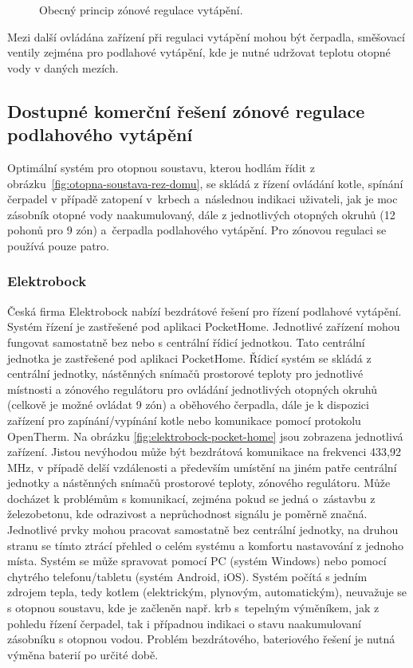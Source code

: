 \newpage
\begin{figure}[H]
    \centering
    \def\svgwidth{\columnwidth}
    
    \caption{Obecný princip zónové regulace vytápění.}
    \label{fig:obecny-princip-zonove-regulace}
\end{figure}

Mezi další ovládána zařízení při regulaci vytápění mohou být čerpadla, směšovací ventily zejména pro podlahové vytápění, kde je nutné udržovat teplotu otopné vody v daných mezích.

\subsection{Dostupné komerční řešení zónové regulace podlahového vytápění}

Optimální systém pro otopnou soustavu, kterou hodlám řídit z obrázku~\ref{fig:otopna-soustava-rez-domu}, se skládá z řízení ovládání kotle, spínání čerpadel v případě zatopení v~krbech a~následnou indikaci uživateli, jak je moc zásobník otopné vody naakumulovaný, dále z jednotlivých otopných okruhů (12 pohonů pro 9 zón) a~čerpadla podlahového vytápění. Pro zónovou regulaci se používá pouze patro.

\subsubsection{Elektrobock}
Česká firma Elektrobock nabízí bezdrátové řešení pro řízení podlahové vytápění. Systém řízení je zastřešené pod aplikaci PocketHome. Jednotlivé zařízení mohou fungovat samostatně bez nebo s centrální řídicí jednotkou. Tato centrální jednotka je zastřešené pod aplikaci PocketHome. Řídicí systém se skládá z centrální jednotky, nástěnných snímačů prostorové teploty pro jednotlivé místnosti a zónového regulátoru pro ovládání jednotlivých otopných okruhů (celkově je možné ovládat 9 zón) a oběhového čerpadla, dále je k dispozici zařízení pro zapínání/vypínání kotle nebo komunikace pomocí protokolu OpenTherm. Na obrázku \ref{fig:elektrobock-pocket-home} jsou zobrazena jednotlivá zařízení. Jistou nevýhodou může být bezdrátová komunikace na frekvenci 433,92 MHz, v případě delší vzdálenosti a především umístění na jiném patře centrální jednotky a nástěnných snímačů prostorové teploty, zónového regulátoru. Může docházet k problémům s komunikací, zejména pokud se jedná o~zástavbu z železobetonu, kde odrazivost a neprůchodnost signálu je poměrně značná. Jednotlivé prvky mohou pracovat samostatně bez centrální jednotky, na druhou stranu se tímto ztrácí přehled o celém systému a komfortu nastavování z jednoho místa. Systém se může spravovat pomocí PC (systém Windows) nebo pomocí chytrého telefonu/tabletu (systém Android, iOS). Systém počítá s jedním zdrojem tepla, tedy kotlem (elektrickým, plynovým, automatickým), neuvažuje se s otopnou soustavu, kde je začleněn např. krb s~tepelným výměníkem, jak z pohledu řízení čerpadel, tak i případnou indikaci o stavu naakumulovaní zásobníku s otopnou vodou. Problém bezdrátového, bateriového řešení je nutná výměna baterií po určité době.


